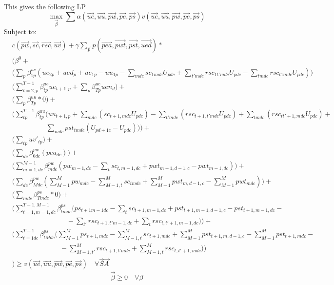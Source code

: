 \documentclass{article}
\begin{document}
This gives the following LP
\begin{equation}
	\max_{\vec{\beta}} \sum \alpha (\vec{ue}, \vec{uu}, \vec{pw}, \vec{pe}, \vec{ps}) v(\vec{ue}, \vec{uu}, \vec{pw}, \vec{pe}, \vec{ps})
\end{equation}
Subject to:
\begin{align*}
	& c(\vec{pw}, \vec{sc}, \vec{rsc}, \vec{uv}) + \gamma \sum_{\vec{p}} p(\vec{pea}, \vec{pwt}, \vec{pst}, \vec{ued})  *  \\
		& \Bigg( \beta^{0} + \\ 
		& \bigg( \sum_{p} \beta_{1p}^{ue} 
			(ue_{2p} + ued_{p} + ue_{1p} - uu_{1p} - \sum_{mdc} sc_{1mdc}U_{pdc} + \sum_{t'mdc} rsc_{1t'mdc}U_{pdc} - \sum_{tmdc} rsc_{t1mdc}U_{pdc}) \bigg)  \\ 
		& \bigg( \sum_{t=2,p}^{T-1} \beta_{tp}^{ue} ue_{t+1,p} + 
				\sum_{p} \beta_{Tp}^{ue} uen_{d} \bigg) + \\
		& \bigg( \sum_{p} \beta_{Tp}^{uu} * 0 \bigg) + \\
		& \bigg( \sum_{tp}^{T-1} \beta_{tp}^{uu} 
				\Big( uu_{t+1,p} + \sum_{mdc} (sc_{t+1,mdc}U_{pdc})  - 
				\sum_{t'mdc} (rsc_{t+1,t'mdc} U_{pdc}) + \sum_{tmdc} (rsc_{tt'+1,mdc} U_{pdc})  + \\ 
				& \quad \quad \quad \quad \quad \sum_{mdc} pst_{tmdc} (U_{pd+1c} - U_{pdc}) \Big) \bigg) +  \\
		& \bigg( \sum_{tp} uv'_{tp} \bigg) + \\ 
			& \bigg( \sum_{dc} \beta_{0dc}^{pw} (pea_{dc}) \bigg) + \\
		&  \bigg( \sum_{m=1,dc}^{M-1} \beta_{mdc}^{pw} 
			(pw_{m-1,dc} - \sum_{t} sc_{t,m-1,dc} + pwt_{m-1,d-1,c} - pwt_{m-1,dc}) \bigg) + \\
		& \bigg( \sum_{dc} \beta_{Mdc}^{pw} 
			(\sum_{M-1}^{M} pw_{mdc} - \sum_{M-1,t}^{M} sc_{tmdc} + 
			\sum_{M-1}^{M} pwt_{m,d-1,c} - \sum_{M-1}^{M} pwt_{mdc}) \bigg) + \\
		& \bigg( \sum_{mdc} \beta_{Tmdc}^{ps} * 0  \bigg) + \\
		& \bigg( \sum_{t=1,m=1,dc}^{T-1,M-1} \beta_{tmdc}^{ps} 
			\Big( ps_{t+1m-1dc} - \sum_{t} sc_{t+1,m-1,dc} + 
			pst_{t+1,m-1,d-1,c} - pst_{t+1,m-1,dc} - \\
		& \quad \quad \quad \quad \quad \quad  \quad \quad- \sum_{t'} rsc_{t+1,t'm-1,dc} +  \sum_{t} rsc_{t,t'+1,m-1,dc} \Big) \bigg) + \\
		& \bigg( \sum_{t=1dc}^{T-1} \beta_{tMdc}^{ps} 
			\Big( \sum_{M-1}^{M} ps_{t+1,mdc} - \sum_{M-1,t}^{M} sc_{t+1,mdc} + 
			\sum_{M-1}^{M} pst_{t+1,m,d-1,c} - \sum_{M-1}^{M} pst_{t+1,mdc} - \\ 
			& \quad \quad \quad \quad \quad \quad \quad - \sum_{M-1,t'}^{M} rsc_{t+1,t'mdc} +  \sum_{M-1,t}^{M} rsc_{t,t'+1,mdc} \Big) \bigg) \\
		& \Bigg) \ge v(\vec{ue}, \vec{uu}, \vec{pw}, \vec{pe}, \vec{ps}) \quad \forall \vec{S} \vec{A}
\end{align*}
\begin{equation*}
	\vec{\beta} \ge 0 \quad \forall \beta
\end{equation*}
\end{document}
